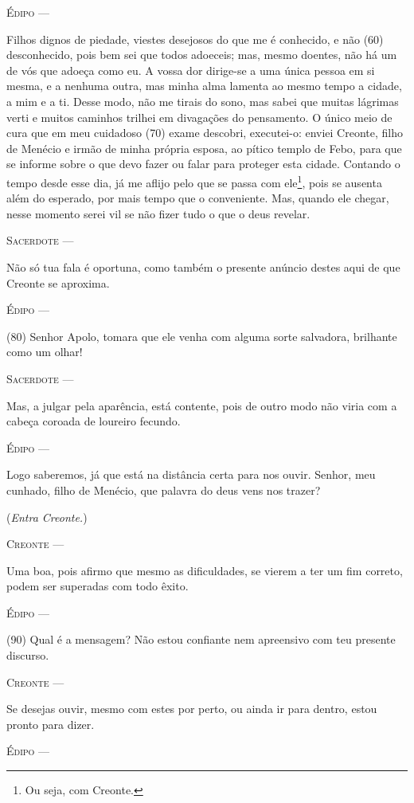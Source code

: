 \textsc{Édipo} ---

Filhos dignos de piedade, viestes desejosos do que me é conhecido, e não
(60) desconhecido, pois bem sei que todos adoeceis; mas, mesmo doentes,
não há um de vós que adoeça como eu. A vossa dor dirige-se a uma única
pessoa em si mesma, e a nenhuma outra, mas minha alma lamenta ao mesmo
tempo a cidade, a mim e a ti. Desse modo, não me tirais do sono, mas
sabei que muitas lágrimas verti e muitos caminhos trilhei em divagações
do pensamento. O único meio de cura que em meu cuidadoso (70) exame
descobri, executei-o: enviei Creonte, filho de Menécio e irmão de minha
própria esposa, ao pítico templo de Febo, para que se informe sobre o
que devo fazer ou falar para proteger esta cidade. Contando o tempo
desde esse dia, já me aflijo pelo que se passa com ele\footnote{Ou seja,
  com Creonte.}, pois se ausenta além do esperado, por mais tempo que o
conveniente. Mas, quando ele chegar, nesse momento serei vil se não
fizer tudo o que o deus revelar.

\textsc{Sacerdote} ---

Não só tua fala é oportuna, como também o presente anúncio destes aqui
de que Creonte se aproxima.

\textsc{Édipo} ---

(80) Senhor Apolo, tomara que ele venha com alguma sorte salvadora,
brilhante como um olhar!

\textsc{Sacerdote} ---

Mas, a julgar pela aparência, está contente, pois de outro modo não
viria com a cabeça coroada de loureiro fecundo.

\textsc{Édipo} ---

Logo saberemos, já que está na distância certa para nos ouvir. Senhor,
meu cunhado, filho de Menécio, que palavra do deus vens nos trazer?

(\emph{Entra Creonte.})

\textsc{Creonte} ---

Uma boa, pois afirmo que mesmo as dificuldades, se vierem a ter um fim
correto, podem ser superadas com todo êxito.

\textsc{Édipo} ---

(90) Qual é a mensagem? Não estou confiante nem apreensivo com teu
presente discurso.

\textsc{Creonte} ---

Se desejas ouvir, mesmo com estes por perto, ou ainda ir para dentro,
estou pronto para dizer.

\textsc{Édipo} ---

